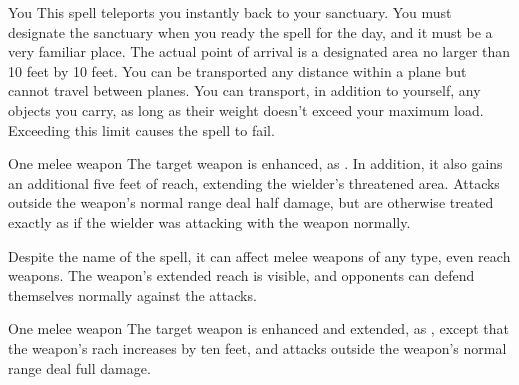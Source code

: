 \begin{spellheader}
\end{spellheader}
\begin{spelleffects}
    \begin{spelltarget}{You}
        \spelleffect This spell teleports you instantly back to your sanctuary. You must designate the sanctuary when you ready the spell for the day, and it must be a very familiar place. The actual point of arrival is a designated area no larger than 10 feet by 10 feet. You can be transported any distance within a plane but cannot travel between planes. You can transport, in addition to yourself, any objects you carry, as long as their weight doesn't exceed your maximum load. Exceeding this limit causes the spell to fail.
    \end{spelltarget}
\end{spelleffects}

\begin{spellheader}
    \spelldur{\durshort}
\end{spellheader}
\begin{spelleffects}
    \begin{spelltarget}{One melee weapon}
        \spelleffect The target weapon is enhanced, as . In addition, it also gains an additional five feet of reach, extending the wielder's threatened area. Attacks outside the weapon's normal range deal half damage, but are otherwise treated exactly as if the wielder was attacking with the weapon normally.
    \end{spelltarget}
\end{spelleffects}
\begin{spellfooter}
    \spellnotes Despite the name of the spell, it can affect melee weapons of any type, even reach weapons. The weapon's extended reach is visible, and opponents can defend themselves normally against the attacks.
\end{spellfooter}

\begin{spellheader}
    \spelldur{\durshort}
\end{spellheader}
\begin{spelleffects}
    \begin{spelltarget}{One melee weapon}
        \spelleffect The target weapon is enhanced and extended, as , except that the weapon's rach increases by ten feet, and attacks outside the weapon's normal range deal full damage.
    \end{spelltarget}
\end{spelleffects}

